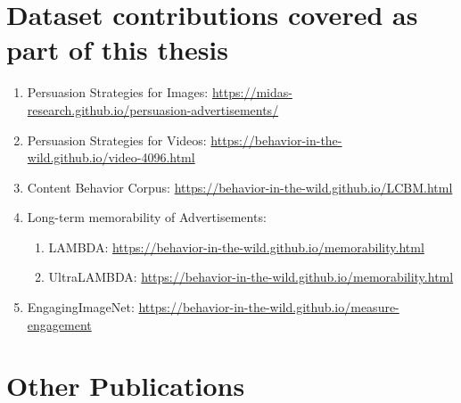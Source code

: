 \chapter*{Dataset contributions covered as part of this thesis}

\begin{enumerate}
    \item Persuasion Strategies for Images: \url{https://midas-research.github.io/persuasion-advertisements/}
    \item Persuasion Strategies for Videos: \url{https://behavior-in-the-wild.github.io/video-4096.html}
    \item Content Behavior Corpus: \url{https://behavior-in-the-wild.github.io/LCBM.html}
    \item Long-term memorability of Advertisements:
    \begin{enumerate}
        \item LAMBDA: \url{https://behavior-in-the-wild.github.io/memorability.html}
        \item UltraLAMBDA: \url{https://behavior-in-the-wild.github.io/memorability.html}
    \end{enumerate}
    \item EngagingImageNet: \url{https://behavior-in-the-wild.github.io/measure-engagement}
\end{enumerate}




\chapter*{Other Publications}

